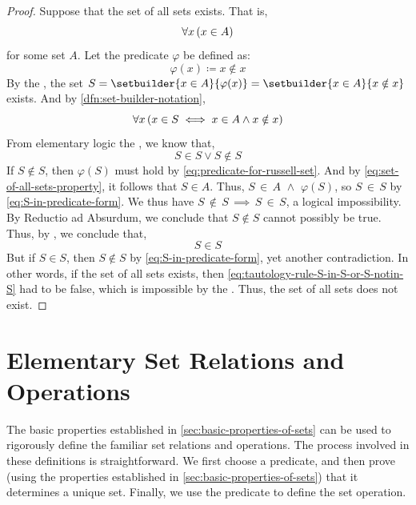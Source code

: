 \begin{proof}
    Suppose that the set of all sets exists. That is,
    \begin{equation}
        \label{eq:set-of-all-sets-property}
        \forall x \, \mleft( x \in A \mright)
    \end{equation}
    for some set \( A \). Let the predicate \( \varphi \)
    be defined as:
    \begin{equation}
        \label{eq:predicate-for-russell-set}
        \varphi(x) \coloneq x \notin x
    \end{equation}
    By the , the set
    \( S = \setbuilder{x \in A}{\varphi(x)} = \setbuilder{x \in A}{x \notin x} \)
    exists.
    And by \cref{dfn:set-builder-notation},
    \begin{equation}
        \label{eq:S-in-predicate-form}
        \forall x \, \mleft( x \in S \iff x \in A \land x \notin x \mright)
    \end{equation}
    From elementary logic the , we know that,
    \begin{equation}
        \label{eq:tautology-rule-S-in-S-or-S-notin-S}
        S \in S \lor S \notin S
    \end{equation}
    If \( S \notin S \), then \( \varphi(S) \) must hold by
    \eqref{eq:predicate-for-russell-set}. And by \eqref{eq:set-of-all-sets-property},
    it follows that \( S \in A \). Thus, \( S \,{\in}\, A \,\,{\land}\,\, \varphi(S) \), so
    \( S \,{\in}\, S \) by \eqref{eq:S-in-predicate-form}. We thus have \( S \,{\notin}\, S \,{\implies}\,
    S \,{\in}\, S \), a logical impossibility. By Reductio ad Absurdum, we conclude that
    \( S \notin S \) cannot possibly be true. Thus, by , we conclude that,
    \begin{equation*}
        S \in S
    \end{equation*}
    But if \( S \in S \), then \( S \notin S \) by \eqref{eq:S-in-predicate-form}, yet another
    contradiction. In other words, if the set of all sets exists, then \eqref{eq:tautology-rule-S-in-S-or-S-notin-S}
    had to be false, which is impossible by the .
    Thus, the set of all sets does not exist.
\end{proof}

\newpage
\section{Elementary Set Relations and Operations}
The basic properties established in \cref{sec:basic-properties-of-sets} can be used
to rigorously define the familiar set relations and operations.
The process involved in these definitions is straightforward. We first choose a
predicate, and then prove (using the properties established in
\cref{sec:basic-properties-of-sets}) that it determines a unique set. Finally, we use
the predicate to define the set operation.

